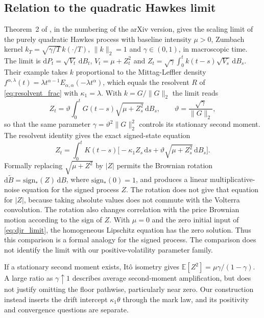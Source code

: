 \documentclass[11pt,a4paper]{article}
\theoremstyle{definition}
\newcommand{\D}{\mathrm{d}}
\newcommand{\E}{\mathbb{E}}
\begin{document}
\subsection{Relation to the quadratic Hawkes limit}\label{sec:micro_relation}

Theorem~2 of \citet{DandapaniJusselinRosenbaum2021}, in the numbering of the arXiv version, gives the scaling limit of the purely quadratic Hawkes process with baseline intensity $\mu>0$, Zumbach kernel $k_T=\sqrt{\gamma/T}\,k(\cdot/T)$, $\|k\|_2=1$ and $\gamma\in(0,1)$, in macroscopic time. The limit is $\D P_t=\sqrt{V_t}\,\D B_t$, $V_t=\mu+Z_t^2$ and $Z_t=\sqrt\gamma\int_0^tk(t-s)\sqrt{V_s}\,\D B_s$. Their example takes $k$ proportional to the Mittag-Leffler density $f^{\alpha,\lambda}(t)=\lambda t^{\alpha-1}E_{\alpha,\alpha}(-\lambda t^\alpha)$, which equals the resolvent $R$ of \eqref{eq:resolvent_frac} with $\kappa_1=\lambda$. With $k=G/\|G\|_2$ the limit reads
\begin{equation}\label{eq:djr_limit}
Z_t=\vartheta\int_0^tG(t-s)\sqrt{\mu+Z_s^2}\,\D B_s,\qquad \vartheta=\frac{\sqrt\gamma}{\|G\|_2},
\end{equation}
so that the same parameter $\gamma=\vartheta^2\|G\|_2^2$ controls its stationary second moment. The resolvent identity gives the exact signed-state equation
\begin{equation*}
Z_t=\int_0^tK(t-s)\big[-\kappa_1Z_s\,\D s+\vartheta\sqrt{\mu+Z_s^2}\,\D B_s\big].
\end{equation*}
Formally replacing $\sqrt{\mu+Z^2}$ by $|Z|$ permits the Brownian rotation $\D\widetilde B=\mathrm{sign}_*(Z)\,\D B$, where $\mathrm{sign}_*(0)=1$, and produces a linear multiplicative-noise equation for the signed process $Z$. The rotation does not give that equation for $|Z|$, because taking absolute values does not commute with the Volterra convolution. The rotation also changes correlation with the price Brownian motion according to the sign of $Z$. With $\mu=0$ and the zero initial input of \eqref{eq:djr_limit}, the homogeneous Lipschitz equation has the zero solution. Thus this comparison is a formal analogy for the signed process. The comparison does not identify the limit with our positive-volatility parameter family.

If a stationary second moment exists, It\^o isometry gives $\E[Z^2]=\mu\gamma/(1-\gamma)$. A large ratio as $\gamma\uparrow1$ describes average second-moment amplification, but does not justify omitting the floor pathwise, particularly near zero. Our construction instead inserts the drift intercept $\kappa_1\theta$ through the mark law, and its positivity and convergence questions are separate.
\end{document}
